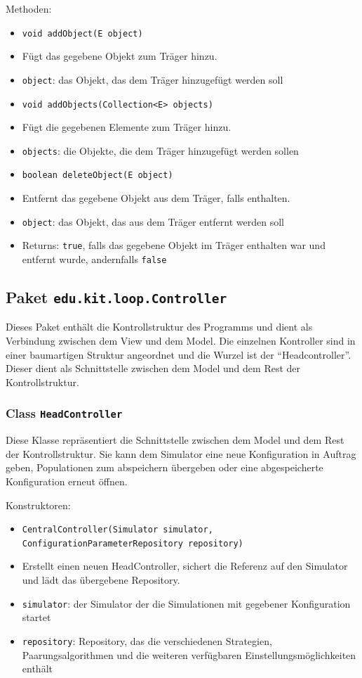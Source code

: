 \documentclass[parskip=full,11pt]{scrartcl}
\begin{document}
Methoden:
\begin{itemize}\itemsep -10pt
\item \texttt{void addObject(E object)}
\item[] Fügt das gegebene Objekt zum Träger hinzu.
\item[] \texttt{object}: das Objekt, das dem Träger hinzugefügt werden soll

\item \texttt{void addObjects(Collection<E> objects)}
\item[] Fügt die gegebenen Elemente zum Träger hinzu.
\item[] \texttt{objects}: die Objekte, die dem Träger hinzugefügt werden sollen

\item \texttt{boolean deleteObject(E object)}
\item[] Entfernt das gegebene Objekt aus dem Träger, falls enthalten.
\item[] \texttt{object}: das Objekt, das aus dem Träger entfernt werden soll
\item[] Returns: \texttt{true}, falls das gegebene Objekt im Träger enthalten war und entfernt wurde, andernfalls \texttt{false}
\end{itemize}

\subsection{Paket \texttt{edu.kit.loop.Controller}}
Dieses Paket enthält die Kontrollstruktur des Programms und dient als Verbindung zwischen dem View und dem Model.
Die einzelnen Kontroller sind in einer baumartigen Struktur angeordnet und die Wurzel ist der \enquote{Headcontroller}. Dieser dient als Schnittstelle zwischen dem Model und dem Rest der Kontrollstruktur.

\subsubsection{Class \texttt{HeadController}}
Diese Klasse repräsentiert die Schnittstelle zwischen dem Model und dem Rest der Kontrollstruktur. Sie kann dem Simulator eine neue Konfiguration in Auftrag geben, Populationen zum abspeichern übergeben oder eine abgespeicherte Konfiguration erneut öffnen.

Konstruktoren:
\begin{itemize}\itemsep -10pt
\item \texttt{CentralController(Simulator simulator, ConfigurationParameterRepository repository)}
\item[] Erstellt einen neuen HeadController, sichert die Referenz auf den Simulator und lädt das übergebene Repository.
\item[] \texttt{simulator}: der Simulator der die Simulationen mit gegebener Konfiguration startet
\item[] \texttt{repository}: Repository, das die verschiedenen Strategien, Paarungsalgorithmen und die weiteren verfügbaren Einstellungsmöglichkeiten enthält
\end{itemize}
\end{document}
